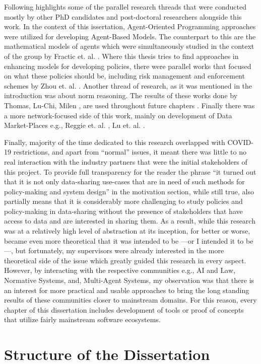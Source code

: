 Following highlights some of the parallel research threads that were conducted mostly by other PhD candidates and post-doctoral researchers alongside this work. In the context of this issertation, Agent-Oriented Programming approaches were utilized for developing Agent-Based Models. The counterpart to this are the mathematical models of agents which were simultaneously studied in the context of the group by Fractic et. al. \cite{Peter}. Where this thesis tries to find approaches in enhancing models for developing policies, there were parallel works that focused on what these policies should be, including risk management and enforcement schemes by Zhou et. al. \cite{Xin}. Another thread of research, as it was mentioned in the introduction was about norm reasoning. The results of these works done by Thomas, Lu-Chi, Milen \cite{Thomas,Milen,Lu-Chi}, are used throughout future chapters . Finally there was a more network-focused side of this work, mainly on development of Data Market-Places e.g., Reggie et. al. \cite{Reggie}, Lu et. al. \cite{Lu}.

Finally, majority of the time dedicated to this research overlapped with COVID-19 restrictions, and apart from ``normal'' issues, it meant there was little to no real interaction with the industry partners that were the initial stakeholders of this project. To provide full transparency for the reader the phrase ``it turned out that it is not only data-sharing use-cases that are in need of such methods for policy-making and system design'' in the motivation section, while still true, also partially means that it is considerably more challenging to study policies and policy-making in data-sharing without the presence of stakeholders that have access to data and are interested in sharing them.  As a result, while this research was at a relatively high level of abstraction at its inception, for better or worse, became even more theoretical that it was intended to be ---or I intended it to be---, but fortunately, my supervisors were already interested in the more theoretical side of the issue \cite{Tom,Giovanni} which greatly guided this research in every aspect. However, by interacting with the respective communities e.g., AI and Law, Normative Systems, and, Multi-Agent Systems, my observation was that there is an interest for more practical and usable approaches to bring the long standing results of these communities closer to mainstream domains. For this reason, every chapter of this dissertation includes development of tools or proof of concepts that utilize fairly mainstream software ecosystems.  

\section{Structure of the Dissertation}



